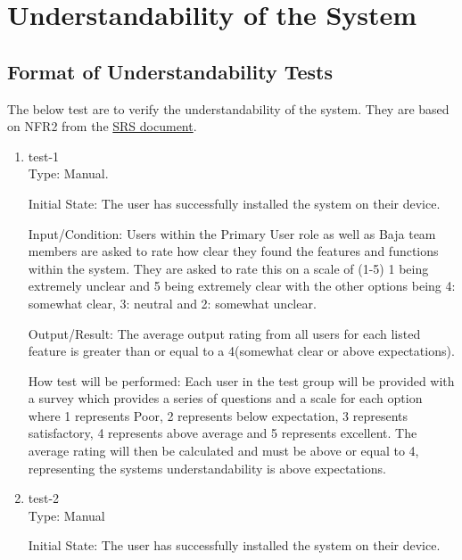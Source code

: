 \documentclass[12pt, titlepage]{article}
\begin{document}
\section{Understandability of the System}

\subsection{Format of Understandability Tests}

The below test are to verify the understandability of the system.
They are based on NFR2 from the \href{https://github.com/gr812b/CVT-Simulator/blob/main/docs/SRS/SRS.pdf}{SRS document}.

\begin{enumerate}

  \item \label{undtest-1}test-1\\

  
  Type: Manual.
            
  Initial State: The user has successfully installed the system on their device.
            
  Input/Condition: Users within the Primary User role as well as Baja team members are asked to rate how clear they found the features and functions within the system. 
  They are asked to rate this on a scale of (1-5) 1 being extremely unclear and 5 being extremely clear with the other options being 4: somewhat clear, 3: neutral and 2: somewhat unclear. 
            
  Output/Result: The average output rating from all users for each listed feature is greater than or equal to a 4(somewhat clear or above expectations).
            
  How test will be performed: Each user in the test group will be provided with a survey which provides a series of questions and a scale for each option where 1 represents Poor, 2 represents below expectation, 3 represents satisfactory, 4 represents above average and 5 represents excellent.
  The average rating will then be calculated and must be above or equal to 4, representing the systems understandability is above expectations.  
  
  \item \label{undtest-2}test-2\\

  
  Type: Manual
            
  Initial State: The user has successfully installed the system on their device.
            

\end{enumerate}
\end{document}
